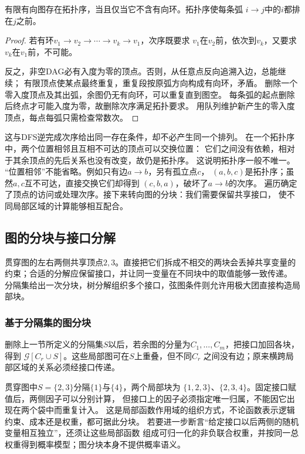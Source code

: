 \begin{theorem}[DAG的拓扑排序]
  \label{thm:graph-theory-topological-order}
  有限有向图存在拓扑序，当且仅当它不含有向环。拓扑序使每条弧
  \(i\to j\)中的\(i\)都排在\(j\)之前。
\end{theorem}

\begin{proof}
若有环\(v_1\to v_2\to\cdots\to v_k\to v_1\)，次序既要求
\(v_1\)在\(v_2\)前，依次到\(v_k\)，又要求\(v_k\)在\(v_1\)前，不可能。

反之，非空DAG必有入度为零的顶点。否则，从任意点反向追溯入边，总能继续；
有限顶点使某点最终重复，重复段按原弧方向构成有向环，矛盾。
删除一个零入度顶点及其出弧，余图仍无有向环，可以重复直到图空。
每条弧的起点删除后终点才可能入度为零，故删除次序满足拓扑要求。
用队列维护新产生的零入度顶点，每点每弧只需检查常数次。
\end{proof}

这与DFS逆完成次序给出同一存在条件，却不必产生同一个排列。
在一个拓扑序中，两个位置相邻且互相不可达的顶点可以交换位置：
它们之间没有依赖，相对于其余顶点的先后关系也没有改变，故仍是拓扑序。
这说明拓扑序一般不唯一。
“位置相邻”不能省略。例如只有边\(a\to b\)，另有孤立点\(c\)，
\((a,b,c)\)是拓扑序；虽然\(a,c\)互不可达，直接交换它们却得到
\((c,b,a)\)，破坏了\(a\to b\)的次序。
遍历确定了顶点的访问或处理次序。接下来转向图的分块：我们需要保留共享接口，
使不同局部区域的计算能够相互配合。

\subsection{图的分块与接口分解}

贯穿图的左右两侧共享顶点\(2,3\)。直接把它们拆成不相交的两块会丢掉共享变量的
约束；合适的分解应保留接口，并让同一变量在不同块中的取值能够一致传递。
分隔集给出一次分块，树分解组织多个接口，弦图条件则允许用极大团直接构造局部块。

\subsubsection{基于分隔集的图分块}
\label{sec:graph-theory-separators}

删除上一节所定义的分隔集\(S\)以后，若余图的分量为\(C_1,\ldots,C_m\)，把接口加回各块，得到
\(\mathcal G[C_r\cup S]\)。这些局部图可在\(S\)上重叠，但不同\(C_r\)
之间没有边；原来横跨局部区域的关系必须经接口传递。

贯穿图中\(S=\{2,3\}\)分隔\(\{1\}\)与\(\{4\}\)，两个局部块为
\(\{1,2,3\}\)、\(\{2,3,4\}\)。固定接口赋值后，两侧因子可以分别计算，
但接口上的因子必须指定唯一归属，不能因它出现在两个袋中而重复计入。
这是局部函数作用域的组织方式，不论函数表示逻辑约束、成本还是权重，都可据此分块。
若要进一步断言“给定接口以后两侧的随机变量相互独立”，还须让这些局部函数
组成可归一化的非负联合权重，并按同一总权重得到概率模型；图分块本身不提供概率语义。

